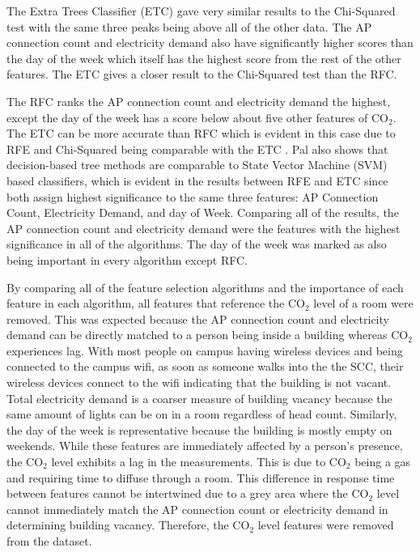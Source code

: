 \documentclass[letterpaper, 12 pt, conference]{ieeeconf}  %
\begin{document}
The Extra Trees Classifier (ETC) gave very similar results to the Chi-Squared test with the same three peaks being above all of the other data. The AP connection count and electricity demand also have significantly higher scores than the day of the week which itself has the highest score from the rest of the other features. The ETC gives a closer result to the Chi-Squared test than the RFC. 

The RFC ranks the AP connection count and electricity demand the highest, except the day of the week has a score below about five other features of CO$_2$. The ETC can be more accurate than RFC which is evident in this case due to RFE and Chi-Squared being comparable with the ETC \cite{Geurts}. Pal \cite{Pal} also shows that decision-based tree methods are comparable to State Vector Machine (SVM) based classifiers, which is evident in the results between RFE and ETC since both assign highest significance to the same three features: AP Connection Count, Electricity Demand, and day of Week.
Comparing all of the results, the AP connection count and electricity demand were the features with the highest significance in all of the algorithms. The day of the week was marked as also being important in every algorithm except RFC.

By comparing all of the feature selection algorithms and the importance of each feature in each algorithm, all features that reference the CO$_2$ level of a room were removed. This was expected because the AP connection count and electricity demand can be directly matched to a person being inside a building whereas CO$_2$ experiences lag. With most people on campus having wireless devices and being connected to the campus wifi, as soon as someone walks into the the SCC, their wireless devices connect to the wifi indicating that the building is not vacant. Total electricity demand is a coarser measure of building vacancy because the same amount of lights can be on in a room regardless of head count. Similarly, the day of the week is representative because the building is mostly empty on weekends. While these features are immediately affected by a person’s presence, the CO$_2$ level exhibits a lag in the measurements. This is due to CO$_2$ being a gas and requiring time to diffuse through a room. This difference in response time between features cannot be intertwined due to a grey area where the CO$_2$ level cannot immediately match the AP connection count or electricity demand in determining building vacancy. Therefore, the CO$_2$ level features were removed from the dataset.
\end{document}
